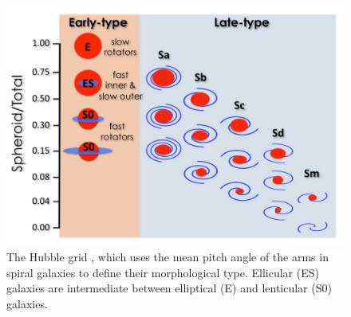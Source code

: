 \documentclass[useAMS,usenatbib,article]{mnras}
\begin{document}
  \begin{figure}[h]
  \begin{center}
  \includegraphics[width=\columnwidth]{Hubblegrid.pdf}
  \caption{The Hubble grid \citep{graham2014review},
  which uses the mean pitch angle of the arms in spiral galaxies to define their morphological type.
  Ellicular (ES) galaxies are intermediate between elliptical (E) and lenticular (S0) galaxies. }
  \label{fig:grid}
  \end{center}
  \end{figure}
\end{document}
